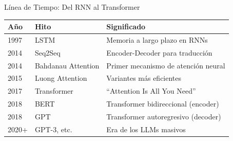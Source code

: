 \documentclass[aspectratio=169]{beamer}
\begin{document}
\begin{frame}{Línea de Tiempo: Del RNN al Transformer}
    \begin{table}[]
        \centering
        \renewcommand{\arraystretch}{1.2}
        \scriptsize
        \begin{tabular}{p{1.5cm} p{4cm} p{6.5cm}}
            \toprule
            \textbf{Año} & \textbf{Hito} & \textbf{Significado} \\
            \midrule
            1997 & LSTM & Memoria a largo plazo en RNNs \\
            2014 & Seq2Seq & Encoder-Decoder para traducción \\
            2014 & Bahdanau Attention & Primer mecanismo de atención neural \\
            2015 & Luong Attention & Variantes más eficientes \\
            2017 & Transformer & ``Attention Is All You Need'' \\
            2018 & BERT & Transformer bidireccional (encoder) \\
            2018 & GPT & Transformer autoregresivo (decoder) \\
            2020+ & GPT-3, etc. & Era de los LLMs masivos \\
            \bottomrule
        \end{tabular}
    \end{table}
\end{frame}
\end{document}
